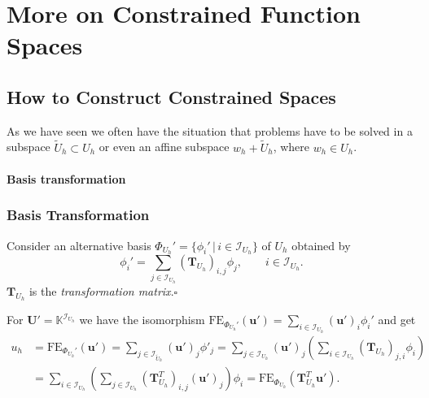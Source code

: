 \section{More on Constrained Function Spaces}\label{Sec:ConstrainedSpaces}

\subsection{How to Construct Constrained Spaces}

As we have seen we often have the situation that problems have to be solved in a
subspace $\tilde{U}_h\subset U_h$ or even an affine subspace
$w_h+\tilde{U}_h$, where $w_h\in U_h$.

\paragraph{Basis transformation} 

\begin{frame}
\frametitle<presentation>{Basis Transformation}
\begin{Def} Consider an alternative basis
$\Phi_{U_h}'=\{\phi_i'\,|\, i\in \mathcal{I}_{U_h}\}$ of $U_h$
obtained by
\begin{equation}
\phi_i' = \sum_{j\in\mathcal{I}_{U_h}}
\left(\mathbf{T}_{U_h}\right)_{i,j} \phi_j, \qquad i\in \mathcal{I}_{U_h}.
\end{equation}
$\mathbf{T}_{U_h}$ is the \textit{transformation matrix}.\hfill$\square$
\end{Def}
For $\mathbf{U}'=\mathbb{K}^{\mathcal{I}_{U_h}}$ we have the isomorphism
$\text{FE}_{\Phi_{U_h}'}(\mathbf{u}') = \sum_{i\in\mathcal{I}_{U_h}}
(\mathbf{u}')_i \phi_i'$ and get
\begin{equation}
\begin{split}
u_h &= \text{FE}_{\Phi_{U_h}'}(\mathbf{u}') = 
\sum_{j\in\mathcal{I}_{\tilde{U}_h}} (\mathbf{u}')_j \phi'_j = 
\sum_{j\in\mathcal{I}_{U_h}} (\mathbf{u}')_j \left (
\sum_{i\in\mathcal{I}_{U_h}}
\left(\mathbf{T}_{U_h}\right)_{j,i} \phi_i \right)\\
&= \sum_{i\in \mathcal{I}_{U_h}} \left (\sum_{j\in\mathcal{I}_{U_h}}
\left(\mathbf{T}^T_{U_h}\right)_{i,j} (\mathbf{u}')_j \right ) \phi_i
= \text{FE}_{\Phi_{U_h}}\left( \mathbf{T}^T_{U_h} \mathbf{u}' \right) .
\end{split}
\end{equation}
\end{frame}

